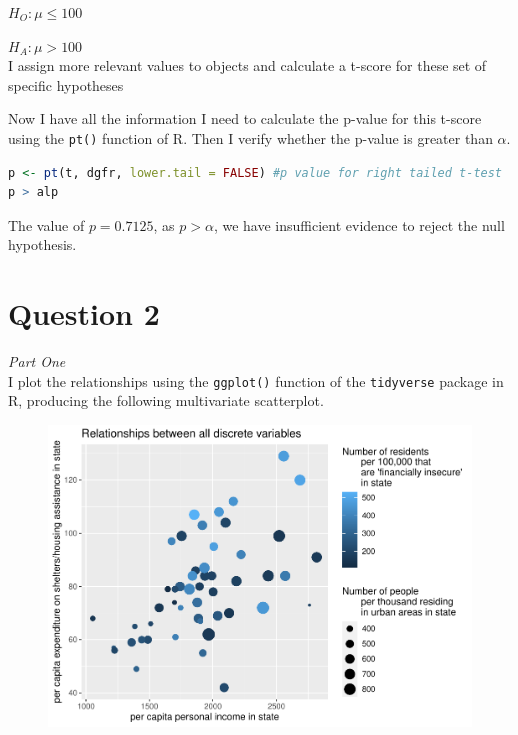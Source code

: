 \documentclass[12pt,letterpaper]{article}
\begin{document}
$H_{O}: \mu \leq 100$

$H_{A}: \mu > 100$\\

\noindent I assign more relevant values to objects and calculate a t-score for these set of specific hypotheses

 

\noindent Now I have all the information I need to calculate the p-value for this t-score using the \texttt{pt()} function of R. Then I verify whether the p-value is greater than $\alpha$.

\begin{lstlisting}[language=R]
p <- pt(t, dgfr, lower.tail = FALSE) #p value for right tailed t-test
p > alp
\end{lstlisting}

\noindent The value of $p = 0.7125$, as $p > \alpha$, we have insufficient evidence to reject the null hypothesis.


\vspace{10cm}

\section*{Question 2 }

\textit{Part One}\\ 

\noindent I plot the relationships using the \texttt{ggplot()} function of the \texttt{tidyverse} package in R, producing the following multivariate scatterplot.

\begin{figure}[h!]\centering
	\label{fig:plot_1}
	\includegraphics[width=.75\textwidth]{Plot 1.pdf}
\end{figure}
\end{document}
